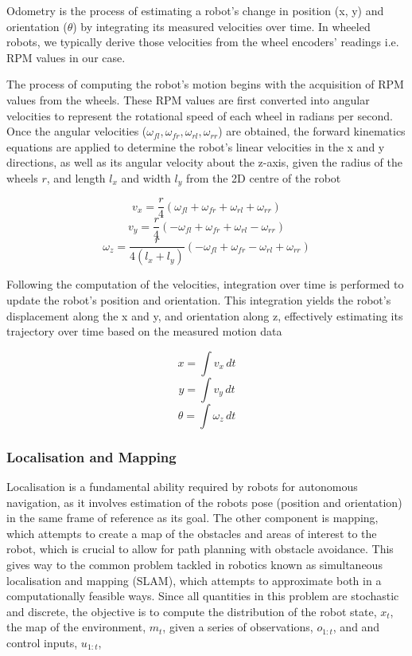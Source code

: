 \documentclass{article}
\begin{document}
Odometry is the process of estimating a robot's change in position (x, y) and orientation ($\theta$) by integrating its measured velocities over time. In wheeled robots, we typically derive those velocities from the wheel encoders' readings i.e. RPM values in our case. 

The process of computing the robot's motion begins with the acquisition of RPM values from the wheels. These RPM values are first converted into angular velocities to represent the rotational speed of each wheel in radians per second. Once the angular velocities ($\omega_{fl}, \omega_{fr}, \omega_{rl}, \omega_{rr}$) are obtained, the forward kinematics equations are applied to determine the robot's linear velocities in the x and y directions, as well as its angular velocity about the z-axis, given the radius of the wheels $r$, and length $l_x$ and width $l_y$ from the 2D centre of the robot

$$ v_x = \frac{r}{4}(\omega_{fl} + \omega_{fr} + \omega_{rl} + \omega_{rr}) $$ 
$$ v_y = \frac{r}{4}(-\omega_{fl} + \omega_{fr} + \omega_{rl} - \omega_{rr}) $$ 
$$ \omega_{z} = \frac{r}{4(l_x+l_y)}(-\omega_{fl} + \omega_{fr} - \omega_{rl} + \omega_{rr}) $$  

Following the computation of the velocities, integration over time is performed to update the robot's position and orientation. This integration yields the robot's displacement along the x and y, and orientation along z, effectively estimating its trajectory over time based on the measured motion data

$$x=\int{v_{x}\,dt}$$
$$y=\int{v_{y}\,dt}$$
$$\theta=\int{\omega_{z}\,dt}$$

\subsubsection{Localisation and Mapping}

Localisation is a fundamental ability required by robots for autonomous navigation, as it involves estimation of the robots pose (position and orientation) in the same frame of reference as its goal. The other component is mapping, which attempts to create a map of the obstacles and areas of interest to the robot, which is crucial to allow for path planning with obstacle avoidance. This gives way to the common problem tackled in robotics known as simultaneous localisation and mapping (SLAM), which attempts to approximate both in a computationally feasible ways. Since all quantities in this problem are stochastic and discrete, the objective is to compute the distribution of the robot state, $x_{t}$, the map of the environment, $m_{t}$, given a series of observations, $o_{1:t}$, and and control inputs, $u_{1:t}$,
\end{document}
